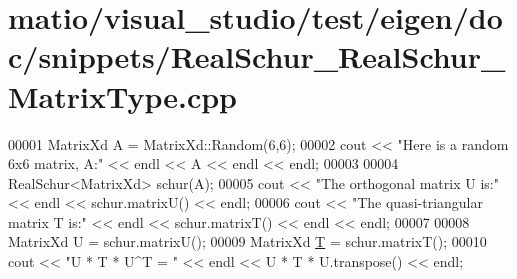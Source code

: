 \hypertarget{matio_2visual__studio_2test_2eigen_2doc_2snippets_2_real_schur___real_schur___matrix_type_8cpp_source}{}\section{matio/visual\+\_\+studio/test/eigen/doc/snippets/\+Real\+Schur\+\_\+\+Real\+Schur\+\_\+\+Matrix\+Type.cpp}
\label{matio_2visual__studio_2test_2eigen_2doc_2snippets_2_real_schur___real_schur___matrix_type_8cpp_source}

\begin{DoxyCode}
00001 MatrixXd A = MatrixXd::Random(6,6);
00002 cout << \textcolor{stringliteral}{"Here is a random 6x6 matrix, A:"} << endl << A << endl << endl;
00003 
00004 RealSchur<MatrixXd> schur(A);
00005 cout << \textcolor{stringliteral}{"The orthogonal matrix U is:"} << endl << schur.matrixU() << endl;
00006 cout << \textcolor{stringliteral}{"The quasi-triangular matrix T is:"} << endl << schur.matrixT() << endl << endl;
00007 
00008 MatrixXd U = schur.matrixU();
00009 MatrixXd \hyperlink{group___sparse_core___module_class_eigen_1_1_triplet}{T} = schur.matrixT();
00010 cout << \textcolor{stringliteral}{"U * T * U^T = "} << endl << U * T * U.transpose() << endl;
\end{DoxyCode}
